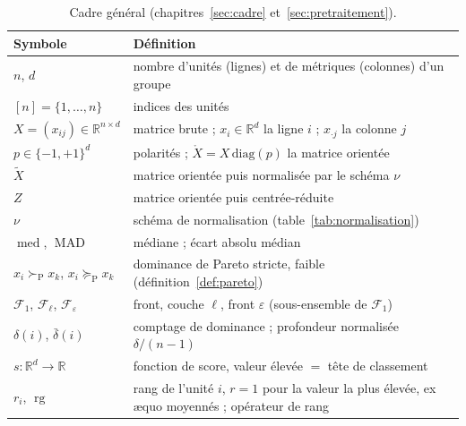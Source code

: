 \documentclass[11pt,a4paper]{article}
\theoremstyle{definition}
\theoremstyle{remark}
\newcommand{\R}{\mathbb{R}}
\newcommand{\pareto}{\succ_{\mathrm{P}}}
\newcommand{\paretoeq}{\succeq_{\mathrm{P}}}
\newcommand{\Xor}{\mathring{X}}
\newcommand{\med}{\operatorname{med}}
\newcommand{\MAD}{\operatorname{MAD}}
\newcommand{\rg}{\operatorname{rg}}
\begin{document}
\begin{table}[htbp]
  \centering
  \small
  \renewcommand{\arraystretch}{1.2}
  \begin{tabularx}{\textwidth}{@{}l X@{}}
    \toprule
    \textbf{Symbole} & \textbf{Définition} \\
    \midrule
    $n$, $d$ & nombre d'unités (lignes) et de métriques (colonnes) d'un groupe \\
    $[n] = \{1,\dots,n\}$ & indices des unités \\
    $X = (x_{ij}) \in \R^{n\times d}$ & matrice brute ; $x_i \in \R^d$ la ligne $i$ ;
      $x_{\cdot j}$ la colonne $j$ \\
    $p \in \{-1,+1\}^d$ & polarités ; $\Xor = X\,\mathrm{diag}(p)$ la matrice orientée \\
    $\tilde{X}$ & matrice orientée puis normalisée par le schéma $\nu$ \\
    $Z$ & matrice orientée puis centrée-réduite \\
    $\nu$ & schéma de normalisation (table~\ref{tab:normalisation}) \\
    $\med$, $\MAD$ & médiane ; écart absolu médian \\
    $x_i \pareto x_k$, $x_i \paretoeq x_k$ & dominance de Pareto stricte, faible
      (définition~\ref{def:pareto}) \\
    $\mathcal{F}_1$, $\mathcal{F}_\ell$, $\mathcal{F}_\varepsilon$ & front, couche $\ell$,
      front $\varepsilon$ (sous-ensemble de $\mathcal{F}_1$) \\
    $\delta(i)$, $\bar\delta(i)$ & comptage de dominance ; profondeur normalisée
      $\delta/(n-1)$ \\
    $s : \R^d \to \R$ & fonction de score, valeur élevée $=$ tête de classement \\
    $r_i$, $\rg$ & rang de l'unité $i$, $r = 1$ pour la valeur la plus élevée, ex \ae quo
      moyennés ; opérateur de rang \\
    \bottomrule
  \end{tabularx}
  \caption{Cadre général (chapitres~\ref{sec:cadre} et~\ref{sec:pretraitement}).}
  \label{tab:notations-cadre}
\end{table}

\bigskip
\end{document}
